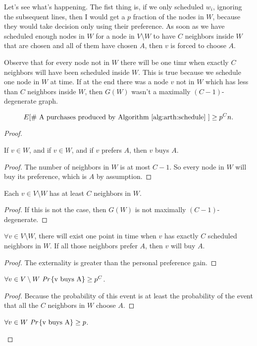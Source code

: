 Let's see what's happening. The fist thing is, if we only scheduled $w_i$, ignoring the subsequent lines, then I would get a $p$ fraction of the nodes in $W$, because they would take decision only using their preference. As soon as we have scheduled enough nodes in $W$ for a node in $V\setminus W$ to have $C$ neighbors inside $W$ that are chosen and all of them have chosen $A$, then $v$ is forced to choose $A$.

Observe that for every node not in $W$ there will be one timr when exactly $C$ neighbors will have been scheduled inside $W$. This is true because we schedule one node in $W$ at time. If at the end there was a node $v$ not in $W$ which has less than $C$ neighbors inside $W$, then $G(W)$ wasn't a maximally $(C-1)$-degenerate graph.
\begin{thm}
	\begin{equation}
		E[\text{\# A purchases produced by Algorithm \ref{alg:arth:schedule} }] \geq p^Cn.
	\end{equation}
\end{thm}

\begin{proof}
	
	\begin{claim}
		If $v \in W$, and if $v \in W$, and if $v$ prefers $A$, then $v$ buys $A$.
	\end{claim}
	\begin{proof}
		The number of neighbors in $W$ is at most $C - 1$. So every node in $W$ will buy its preference, which is $A$ by assumption.
	\end{proof}
	
	\begin{claim}
		Each $v \in V \setminus W$ has at least $C$ neighbors in $W$.
	\end{claim}
	\begin{proof}
		If this is not the case, then $G(W)$ is not maximally $(C-1)$-degenerate.
	\end{proof}
	\begin{claim}
		$\forall v \in V \setminus W$, there will exist one point in time when $v$ has exactly $C$ scheduled neighbors in $W$. If all those neighbors prefer $A$, then $v$ will buy $A$. 
	\end{claim}
	\begin{proof}
		The externality is greater than the personal preference gain.
	\end{proof}
	\begin{claim}
		$\forall v \in V\setminus W\ \emph{Pr}\left\{\text{v buys A}\right\} \geq p^C$.
	\end{claim}
	\begin{proof}
		Because the probability of this event is at least the probability of the event that all the $C$ neighbors in $W$ choose $A$.
	\end{proof}
	\begin{claim}
		$\forall v \in W\ \emph{Pr}\left\{\text{v buys A}\right\} \geq p$.
	\end{claim}
\end{proof}